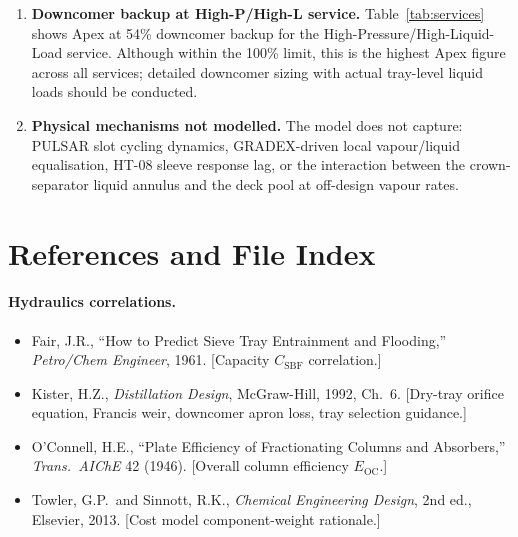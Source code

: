 \documentclass[11pt,letterpaper]{article}
\newcommand{\Csb}{C_{\mathrm{SBF}}}
\newcommand{\eoc}{E_{\mathrm{OC}}}
\begin{document}
\begin{enumerate}[nosep]
  \item \textbf{Downcomer backup at High-P/High-L service.}
    Table~\ref{tab:services} shows Apex at 54\% downcomer backup for the
    High-Pressure/High-Liquid-Load service.  Although within the 100\% limit,
    this is the highest Apex figure across all services; detailed downcomer
    sizing with actual tray-level liquid loads should be conducted.

  \item \textbf{Physical mechanisms not modelled.}
    The model does not capture: PULSAR slot cycling dynamics, GRADEX-driven
    local vapour/liquid equalisation, HT-08 sleeve response lag, or the
    interaction between the crown-separator liquid annulus and the deck pool
    at off-design vapour rates.
\end{enumerate}

\section{References and File Index}
\label{sec:refs}

\paragraph{Hydraulics correlations.}
\begin{itemize}[nosep]
  \item Fair, J.R., ``How to Predict Sieve Tray Entrainment and Flooding,''
    \textit{Petro/Chem Engineer}, 1961.  [Capacity $\Csb$ correlation.]
  \item Kister, H.Z., \textit{Distillation Design}, McGraw-Hill, 1992, Ch.~6.
    [Dry-tray orifice equation, Francis weir, downcomer apron loss, tray
    selection guidance.]
  \item O'Connell, H.E., ``Plate Efficiency of Fractionating Columns and
    Absorbers,'' \textit{Trans.\ AIChE} 42 (1946).  [Overall column
    efficiency $\eoc$.]
  \item Towler, G.P.\ and Sinnott, R.K., \textit{Chemical Engineering Design},
    2nd ed., Elsevier, 2013.  [Cost model component-weight rationale.]
\end{itemize}
\end{document}
